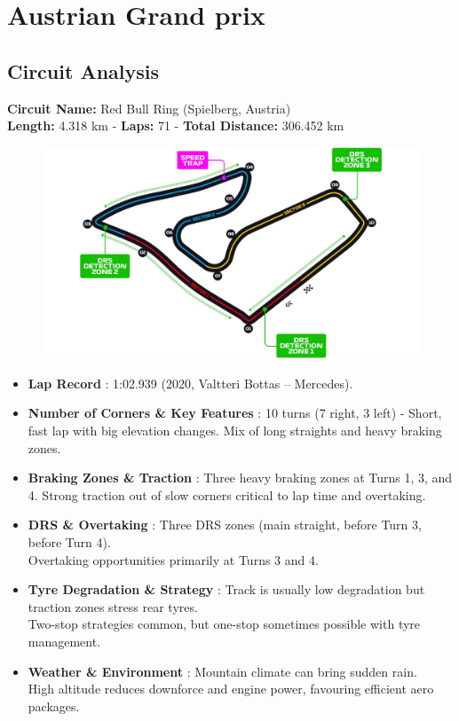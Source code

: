 \section{Austrian Grand prix}

\subsection{Circuit Analysis}

\textbf{Circuit Name:} Red Bull Ring (Spielberg, Austria) \\
\textbf{Length:} 4.318 km - \textbf{Laps:} 71 - \textbf{Total Distance:} 306.452 km

\begin{figure}[H]
    \centering
    \includegraphics[width=0.75\linewidth]{images/11.Austria_Circuit.jpg}
\end{figure}

\begin{itemize}
    \item \textbf{Lap Record} : 1:02.939 (2020, Valtteri Bottas – Mercedes).
    
    \item \textbf{Number of Corners \& Key Features} : 10 turns (7 right, 3 left) - Short, fast lap with big elevation changes. Mix of long straights and heavy braking zones.
    
    \item \textbf{Braking Zones \& Traction} : Three heavy braking zones at Turns 1, 3, and 4. Strong traction out of slow corners critical to lap time and overtaking.

    \item \textbf{DRS \& Overtaking} : Three DRS zones (main straight, before Turn 3, before Turn 4). \\
    Overtaking opportunities primarily at Turns 3 and 4.
    
    \item \textbf{Tyre Degradation \& Strategy} : Track is usually low degradation but traction zones stress rear tyres.\\
    Two-stop strategies common, but one-stop sometimes possible with tyre management.
    
    \item \textbf{Weather \& Environment} : Mountain climate can bring sudden rain.\\
    High altitude reduces downforce and engine power, favouring efficient aero packages.
\end{itemize}

